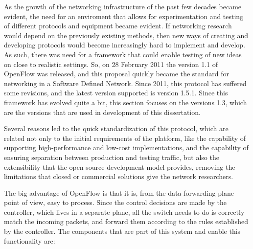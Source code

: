 As the growth of the networking infrastructure of the past few decades became evident, the need for an enviroment that allows for experimentation and testing of different protocols and equipment became evident. If networking 
research would depend on the previously existing methods, then new ways of creating and developing protocols would become increasingly hard to implement and develop. As such, there was need for a framework that could 
enable testing of new ideas on close to realistic settings. So, on 28 February 2011 the version 1.1 of OpenFlow was released, and this proposal quickly became the standard for networking in a Software Defined Network. Since
2011, this protocol has suffered some revisions, and the latest version supported is version 1.5.1. Since this framework has evolved quite a bit, this section focuses on the versions 1.3, which are the versions that 
are used in development of this dissertation. 
\par Several reasons led to the quick standardization of this protocol, which are related not only to the initial requirements of the platform, like the capability of supporting high-performance and low-cost implementations, 
and the capability of ensuring separation between production and testing traffic, but also the extensibility that the open source development model provides, removing the limitations that closed or commercial solutions give the 
network researchers.
\par The big advantage of OpenFlow is that it is, from the data forwarding plane point of view, easy to process. Since the control decisions are made by the controller, which lives in a separate plane, all the switch needs to do
is correctly match the incoming packets, and forward them according to the rules established by the controller. The components that are part of this system and enable this functionality are:

